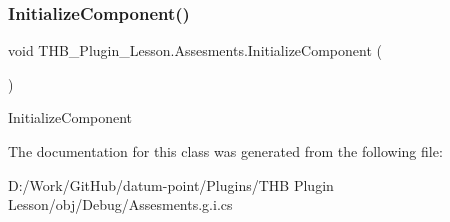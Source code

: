 \subsubsection{\texorpdfstring{Initialize\+Component()}{InitializeComponent()}\hspace{0.1cm}{\footnotesize\ttfamily [2/2]}}
{\footnotesize\ttfamily void T\+H\+B\+\_\+\+Plugin\+\_\+\+Lesson.\+Assesments.\+Initialize\+Component (\begin{DoxyParamCaption}{ }\end{DoxyParamCaption})}



Initialize\+Component 



The documentation for this class was generated from the following file\+:\begin{DoxyCompactItemize}
\item 
D\+:/\+Work/\+Git\+Hub/datum-\/point/\+Plugins/\+T\+H\+B Plugin Lesson/obj/\+Debug/Assesments.\+g.\+i.\+cs\end{DoxyCompactItemize}
